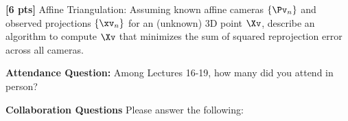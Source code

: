 \documentclass[11pt,addpoints,answers]{exam}
\numberwithin{equation}{section} %
\numberwithin{figure}{section} %
\numberwithin{table}{section} %
\begin{document}
\begin{questions}
\newpage

\question \textbf{[6 pts]} Affine Triangulation: Assuming known affine cameras $\{\Pv_n\}$ and observed projections $\{\xv_n\}$ for an (unknown) 3D point $\Xv$, describe an algorithm to compute $\Xv$ that minimizes the sum of squared reprojection error across all cameras.

\begin{tcolorbox}[fit,height=16cm, width=\textwidth, blank, borderline={0.5pt}{-2pt},halign=left, valign=center, nobeforeafter]


\end{tcolorbox}


\end{questions}

\clearpage

\textbf{Attendance Question:} Among Lectures 16-19, how many did you attend in person?

\begin{tcolorbox}[fit,height=1cm,blank, borderline={1pt}{-2pt},nobeforeafter]
\end{tcolorbox}


    
\textbf{Collaboration Questions} Please answer the following:
\end{document}

